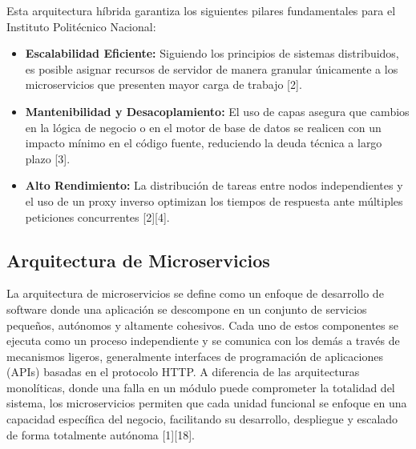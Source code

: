 Esta arquitectura híbrida garantiza los siguientes pilares fundamentales para el Instituto Politécnico Nacional:
\begin{itemize}
    \item \textbf{Escalabilidad Eficiente:} Siguiendo los principios de sistemas distribuidos, es posible asignar recursos de servidor de manera granular únicamente a los microservicios que presenten mayor carga de trabajo [2].
    \item \textbf{Mantenibilidad y Desacoplamiento:} El uso de capas asegura que cambios en la lógica de negocio o en el motor de base de datos se realicen con un impacto mínimo en el código fuente, reduciendo la deuda técnica a largo plazo [3].
    \item \textbf{Alto Rendimiento:} La distribución de tareas entre nodos independientes y el uso de un proxy inverso optimizan los tiempos de respuesta ante múltiples peticiones concurrentes [2][4].
\end{itemize}


\subsection{Arquitectura de Microservicios}

La arquitectura de microservicios se define como un enfoque de desarrollo de software donde una aplicación se descompone en un conjunto de servicios pequeños, autónomos y altamente cohesivos. Cada uno de estos componentes se ejecuta como un proceso independiente y se comunica con los demás a través de mecanismos ligeros, generalmente interfaces de programación de aplicaciones (APIs) basadas en el protocolo HTTP. A diferencia de las arquitecturas monolíticas, donde una falla en un módulo puede comprometer la totalidad del sistema, los microservicios permiten que cada unidad funcional se enfoque en una capacidad específica del negocio, facilitando su desarrollo, despliegue y escalado de forma totalmente autónoma [1][18].



